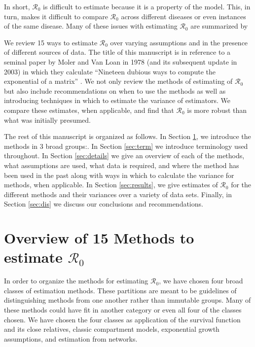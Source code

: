 \documentclass[12pt]{article}
\newcommand{\XX}{15 } %
\newcommand{\rr}{\ensuremath{\mathcal{R}_0}}
\begin{document}
In short, $\rr$ is difficult to estimate because it is a property of the model.  This, in turn, makes it difficult to compare $\rr$ across different diseases or even instances of the same disease.  Many of these issues with estimating $\rr$ are summarized by \cite{li2011}

We review \XX ways to estimate $\rr$ over varying assumptions and in the presence of different sources of data.  The title of this manuscript is in reference to a seminal paper by Moler and Van Loan in 1978 (and its subsequent update in 2003) in which they calculate ``Nineteen dubious ways to compute the exponential of a matrix'' \citep{moler2003}.  We not only review the methods of estimating of $\rr$ but also include recommendations on when to use the methods as well as introducing techniques in which to estimate the variance of estimators.  We compare these estimates, when applicable, and find that $\rr$ is more robust than what was initially presumed.

The rest of this manuscript is organized as follows.  In Section \ref{sec:overview}, we introduce the methods in 3 broad groups:.  In Section \ref{sec:term} we introduce terminology used throughout.  In Section \ref{sec:details} we give an overview of each of the methods, what assumptions are used, what data is required, and where the method has been used in the past along with ways in which to calculate the variance for methods, when applicable.  In Section \ref{sec:results}, we give estimates of $\rr$ for the different methods and their variances over a variety of data sets.  Finally, in Section \ref{sec:dis} we discuss our conclusions and recommendations.


\section{Overview of \XX Methods to estimate $\rr$}
\label{sec:overview}

In order to organize the methods for estimating \rr, we have chosen four broad classes of estimation methods.  These partitions are meant to be guidelines of distinguishing methods from one another rather than immutable groups.  Many of these methods could have fit in another category or even all four of the classes chosen.  We have chosen the four classes as application of the survival function and its close relatives, classic compartment models, exponential growth assumptions, and estimation from networks.
\end{document}

